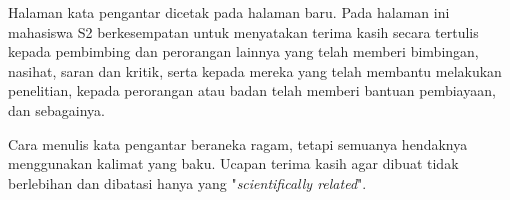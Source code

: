 \documentclass{itb-thesis}
\begin{document}
\preface
\begin{onehalfspace}
Halaman kata pengantar dicetak pada halaman baru. Pada halaman ini mahasiswa S2 berkesempatan untuk menyatakan terima kasih secara tertulis kepada pembimbing dan perorangan lainnya yang telah memberi bimbingan, nasihat, saran dan kritik, serta kepada mereka yang telah membantu melakukan penelitian, kepada perorangan atau badan telah memberi bantuan pembiayaan, dan sebagainya.

\vspace{14pt}

Cara menulis kata pengantar beraneka ragam, tetapi semuanya hendaknya menggunakan kalimat yang baku. Ucapan terima kasih agar dibuat tidak berlebihan dan dibatasi hanya yang "\textit{scientifically related}".
\end{onehalfspace}

\tableofcontents
{}
\end{document}
